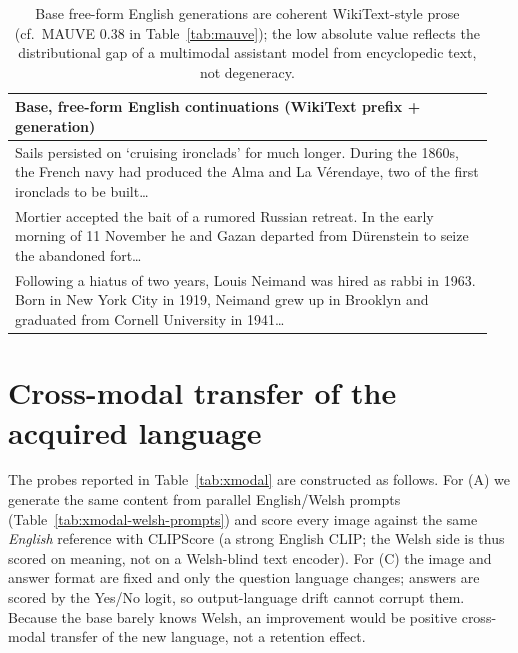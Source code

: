\documentclass{article}
\begin{document}
\begin{table}[h]\centering\footnotesize
\renewcommand{\arraystretch}{1.2}
\begin{tabular}{@{}p{0.95\linewidth}@{}}
\toprule
\textbf{Base, free-form English continuations (WikiText prefix + generation)}\\
\midrule
\footnotesize Sails persisted on `cruising ironclads' for much longer. During the
1860s, the French navy had produced the Alma and La V\'erendaye, two of the first
ironclads to be built\dots\\
\midrule
\footnotesize Mortier accepted the bait of a rumored Russian retreat. In the early
morning of 11 November he and Gazan departed from D\"urenstein to seize the
abandoned fort\dots\\
\midrule
\footnotesize Following a hiatus of two years, Louis Neimand was hired as rabbi in
1963. Born in New York City in 1919, Neimand grew up in Brooklyn and graduated
from Cornell University in 1941\dots\\
\bottomrule
\end{tabular}
\caption{Base free-form English generations are coherent WikiText-style prose
(cf.\ MAUVE $0.38$ in Table~\ref{tab:mauve}); the low absolute value reflects the
distributional gap of a multimodal assistant model from encyclopedic text, not
degeneracy.}
\label{tab:mauve-samples}
\end{table}


\section{Cross-modal transfer of the acquired language}
\label{app:xmodal}
The probes reported in Table~\ref{tab:xmodal} are constructed as follows. For (A)
we generate the same content from parallel English/Welsh prompts
(Table~\ref{tab:xmodal-welsh-prompts}) and score every image against the same
\emph{English} reference with CLIPScore (a strong English CLIP; the Welsh side is
thus scored on meaning, not on a Welsh-blind text encoder). For (C) the image and
answer format are fixed and only the question language changes; answers are
scored by the Yes/No logit, so output-language drift cannot corrupt them. Because
the base barely knows Welsh, an improvement would be positive cross-modal
transfer of the new language, not a retention effect.
\end{document}
